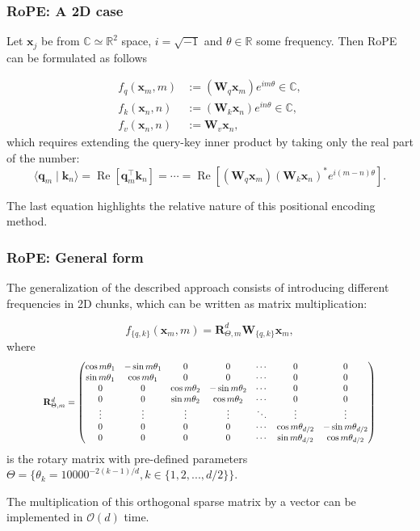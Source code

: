 \documentclass[notheorems,10pt]{beamer}
\def\q{{\mathbf q}}
\def\k{{\mathbf k}}
\def\x{{\mathbf x}}
\def\W{{\mathbf W}}
\def\R{{\mathbf R}}
\begin{document}
\begin{frame}
    \frametitle{RoPE: A 2D case}

    Let $\x_j$ be from $\mathbb{C} \simeq \mathbb{R}^2$ space, $i = \sqrt{-1}$ and $\theta \in \mathbb{R}$ some frequency. \pause Then RoPE can be formulated as follows


    \begin{equation*}
        \begin{aligned}
    	f_q(\x_m, m) & := (\W_q\x_m)e^{im\theta} \in \mathbb{C},\\
    	f_k(\x_n, n) & := (\W_k\x_n)e^{in\theta} \in \mathbb{C},\\
            f_v(\x_n, n) & := \W_v\x_n,
        \end{aligned}
    \end{equation*}
    which requires extending the query-key inner product by taking only the real part of the number:
    \begin{equation*}
        \langle \q_m \mid \k_n \rangle = \operatorname{Re}[\q_m^{\intercal}\k_n] = \cdots = \operatorname{Re}[(\W_q\x_m)(\W_k\x_n)^{*}e^{i(m - n)\theta}].
    \end{equation*}

    \pause
    The last equation highlights the relative nature of this positional encoding method. 
\end{frame}

\begin{frame}
    \frametitle{RoPE: General form}

    The generalization of the described approach consists of introducing different frequencies in 2D chunks, which can be written as matrix multiplication:

    \begin{equation*}
	f_{\{q, k\}}(\x_m, m) = \R^d_{\Theta, m}\W_{\{q, k\}}\x_m,
    \end{equation*}
    where 
    \begin{equation*}
    \scalebox{0.8}{$
    	\R^d_{\Theta,m} = 
    	\begin{pmatrix}
    		\cos{m\theta_1}& -\sin{m\theta_1}&0&0&\cdots&0&0\\
    		\sin{m\theta_1}&\cos{m\theta_1}&0&0&\cdots&0&0 \\
    		0&0&\cos{m\theta_2}& -\sin{m\theta_2}&\cdots&0&0\\
    		0&0&\sin{m\theta_2}&\cos{m\theta_2}&\cdots&0&0 \\
    		\vdots&\vdots&\vdots&\vdots&\ddots&\vdots&\vdots\\
    		0&0&0&0&\cdots&\cos{m\theta_{d/2}}& -\sin{m\theta_{d/2}}\\
    		0&0&0&0&\cdots&\sin{m\theta_{d/2}}&\cos{m\theta_{d/2}}
    	\end{pmatrix}
    $}
    \end{equation*}
    is the rotary matrix with pre-defined parameters $\Theta = \{\theta_k=10000^{-2(k-1)/d}, k \in \{1, 2, ..., d/2\}\}$.

    \vfill
    The multiplication of this orthogonal sparse matrix by a vector can be implemented in $\mathcal{O}(d)$ time.
\end{frame}
\end{document}
